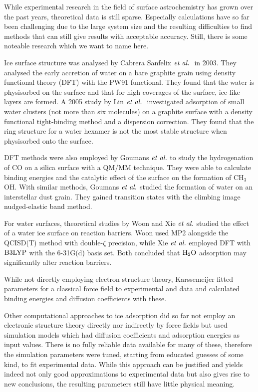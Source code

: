 \documentclass[8.5pt,twoside,twocolumn]{article}
\theoremstyle{standard}
\begin{document}
While experimental research in the field of surface astrochemistry has grown
over the past years, theoretical data is still sparse. Especially 
calculations have so far been challenging due to the large system size and the
resulting difficulties to find methods that can still give results with
acceptable accuracy. Still, there is some noteable research which we want to
name here.

Ice surface structure was analysed by Cabrera Sanfelix $\emph{et al.}~$ 
\cite{CabreraSanfelix2003} in 2003. They analysed the early accretion of water
on a bare graphite grain using density functional theory (DFT) with the PW91
functional\cite{PerdewWang1986,PerdewWang1992}. They found that the water is
physisorbed on the surface and that for high coverages of the surface, ice-like
layers are formed. A 2005 study by Lin $\emph{et al.}~$ \cite{LinZhangLeeEtAl2005}
investigated adsorption of small water clusters (not more than six molecules)
on a graphite surface with a density functional tight-binding method and a
dispersion correction. They found that the ring structure for a water hexamer
is not the most stable structure when physisorbed onto the surface.

DFT methods were also employed by Goumans $\emph{et al.}$\cite{GoumansCatlowBrown2008}
to study the hydrogenation of CO on a silica surface with a QM/MM technique.
They were able to calculate binding energies and the catalytic effect of the
surface on the formation of CH$_3$OH. With similar methods, Goumans $\emph{et al.}$
\cite{GoumansCatlowBrownEtAl2009} studied the formation of water on an
interstellar dust grain. They gained transition states with the climbing image
nudged-elastic band method\cite{HenkelmanUberuagaJonsson2000}.

For water surfaces, theoretical studies by Woon\cite{Woon2002}
and Xie $\emph{et al.}$\cite{XieDingSun2006} studied the effect of a water ice surface
on reaction barriers. Woon used MP2 \cite{MP2} alongside the QCISD(T)
\cite{QCISD} method with double-$\zeta$ precision, while Xie $\emph{et al.}$
employed DFT with $\text{B3LYP}$ with the 6-31G(d) basis set. Both concluded that
$\text H _2 \text O$ adsorption may significantly alter reaction barriers.

While not directly employing electron structure theory,
Karssemeijer\cite{KarssemeijerPedersenJonssonEtAl2012} fitted parameters for a
classical force field to experimental and  data and calculated
binding energies and diffusion coefficients with these.

Other computational approaches to ice adsorption did so far not employ an
electronic structure theory directly nor indirectly by force fields but used
simulation models which had diffusion coefficients and adsorption energies as input values. There is no
fully reliable data available for many of these, therefore the simulation
parameters were tuned, starting from educated guesses of some kind, to fit
experimental data. While this approach can be justified and yields indeed not
only good approximations to experimental data but also gives rise to new conclusions,
the resulting parameters still have little physical meaning.
\end{document}
